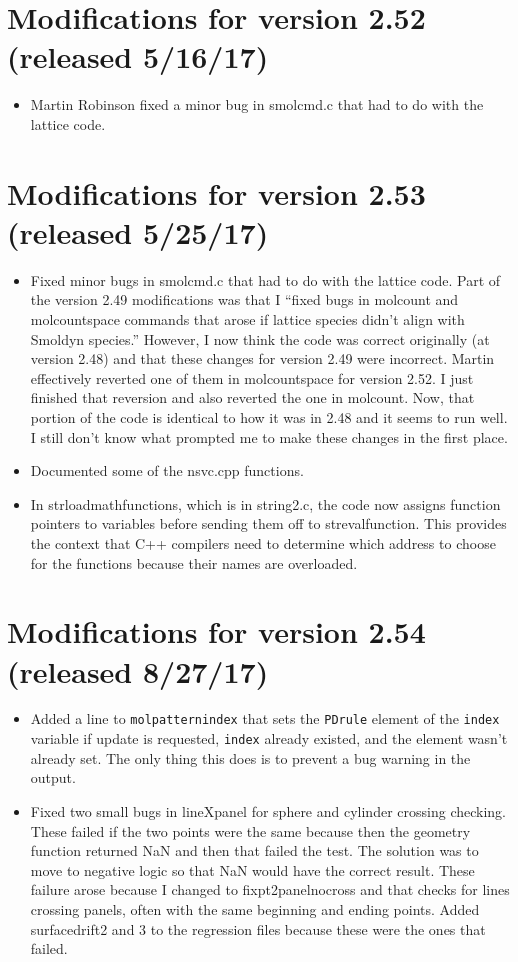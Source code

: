 \documentclass {scrbook}
\newcommand {\ttt} {\texttt}
\begin{document}
\section{Modifications for version 2.52 (released 5/16/17)}
\begin{itemize}
\item Martin Robinson fixed a minor bug in smolcmd.c that had to do with the lattice code.
\end{itemize}

\section{Modifications for version 2.53 (released 5/25/17)}
\begin{itemize}
\item Fixed minor bugs in smolcmd.c that had to do with the lattice code. Part of the version 2.49 modifications was that I ``fixed bugs in molcount and molcountspace commands that arose if lattice species didn't align with Smoldyn species.'' However, I now think the code was correct originally (at version 2.48) and that these changes for version 2.49 were incorrect. Martin effectively reverted one of them in molcountspace for version 2.52. I just finished that reversion and also reverted the one in molcount. Now, that portion of the code is identical to how it was in 2.48 and it seems to run well. I still don't know what prompted me to make these changes in the first place.
\item Documented some of the nsvc.cpp functions.
\item In strloadmathfunctions, which is in string2.c, the code now assigns function pointers to variables before sending them off to strevalfunction. This provides the context that C++ compilers need to determine which address to choose for the functions because their names are overloaded.
\end{itemize}

\section{Modifications for version 2.54 (released 8/27/17)}
\begin{itemize}
\item Added a line to \ttt{molpatternindex} that sets the \ttt{PDrule} element of the \ttt{index} variable if update is requested, \ttt{index} already existed, and the element wasn't already set. The only thing this does is to prevent a bug warning in the output.
\item Fixed two small bugs in lineXpanel for sphere and cylinder crossing checking. These failed if the two points were the same because then the geometry function returned NaN and then that failed the test. The solution was to move to negative logic so that NaN would have the correct result. These failure arose because I changed to fixpt2panelnocross and that checks for lines crossing panels, often with the same beginning and ending points. Added surfacedrift2 and 3 to the regression files because these were the ones that failed.
\end{itemize}
\end{document}
